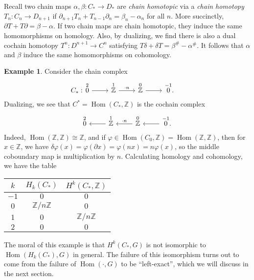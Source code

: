 \documentclass{book}
\newcommand{\bbZ}{\mathbb{Z}}
\newcommand{\bbZmod}[1]{\bbZ/{#1}\bbZ}
\renewcommand{\phi}{\varphi}
\DeclareMathOperator{\Hom}{Hom}
\theoremstyle{definition}
\newtheorem{example}[theorem]{Example}
\theoremstyle{remark}
\numberwithin{equation}{section}
\begin{document}
Recall two chain maps $\alpha,\beta \colon C_* \to D_*$ are \textit{chain homotopic} via a \textit{chain homotopy} $T_n \colon C_n \to D_{n+1}$ if $\partial_{n+1}T_n + T_{n-1}\partial_n = \beta_n - \alpha_n$ for all $n$. More succinctly, $\partial T + T \partial = \beta - \alpha$. If two chain maps are chain homotopic, they induce the same homomorphisms on homology. Also, by dualizing, we find there is also a dual cochain homotopy $T^n \colon D^{n+1} \to C^n$ satisfying $T \delta + \delta T = \beta^\# - \alpha^\#$. It follows that $\alpha$ and $\beta$ induce the same homomorphisms on cohomology.

\begin{example}
    Consider the chain complex
    \begin{equation} \begin{aligned}
        C_* : & 
        \begin{tikzcd} 
            \overset{2}{0} \arrow[r] & \overset{1}{\bbZ} \arrow[r,"\cdot n"] & \overset{0}{\bbZ} \arrow[r] & \overset{-1}{0}. 
        \end{tikzcd}
        & \hphantom{ }
    \end{aligned} \end{equation}
    Dualizing, we see that $C^* = \Hom(C_*, \bbZ)$ is the cochain complex 
    \begin{equation}
        \begin{tikzcd} 
         \overset{2}{0} & \overset{1}{\bbZ} \arrow[l] & \overset{0}{\bbZ} \arrow[l,"\cdot n" above] & \overset{-1}{0} \arrow[l].
        \end{tikzcd}
    \end{equation}
    Indeed, $\Hom(\bbZ,\bbZ) \cong \bbZ$, and if $\phi \in \Hom(C_0,\bbZ) = \Hom(\bbZ,\bbZ)$, then for $x \in \bbZ$, we have $\delta\phi(x) = \phi(\partial x) = \phi(nx) = n\phi(x)$, so the middle coboundary map is multiplication by $n$. Calculating homology and cohomology, we have the table 
    \begin{center}
        \begin{tabular}{c|cc}
            $k$  & $H_k(C_*)$   & $H^k(C_*,\bbZ)$ \\
            \hline 
            $-1$ & $0$          & $0$             \\
            $0$  & $\bbZmod{n}$ & $0$             \\
            $1$  & $0$          & $\bbZmod{n}$    \\
            $2$  & $0$          & $0$ 
        \end{tabular}
    \end{center}
    The moral of this example is that $H^k(C_*,G)$ is not isomorphic to $\Hom(H_k(C_*),G)$ in general. The failure of this isomorphism turns out to come from the failure of $\Hom(\cdot,G)$ to be ``left-exact'', which we will discuss in the next section.
\end{example}
\end{document}
